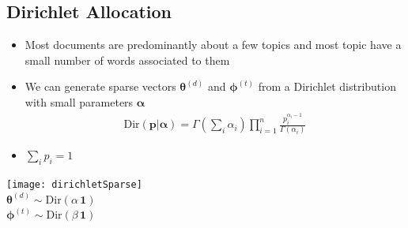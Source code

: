 \begin{slide}
\section[-2]{Dirichlet Allocation}

\begin{minipage}{0.5\linewidth}
  \begin{PauseHighLight}
  \begin{itemize}
  \item Most documents are predominantly about a few topics and most
    topic have a small number of words associated to them\pause
  \item We can generate sparse vectors $\bm{\theta}^{(d)}$ and
    $\bm{\phi}^{(t)}$ from a Dirichlet distribution with small parameters
    $\bm{\alpha}$ 
    \begin{align*}
      \mathrm{Dir}(\bm{p}|\bm{\alpha}) = \Gamma\!\left(\sum_i
      \alpha_i\right) \prod_{i=1}^n
      \frac{p_i^{\alpha_i-1}}{\Gamma(\alpha_i)}
    \end{align*}
  \item $\sum\limits_{i} p_i=1$\pause
    \end{itemize}
\end{PauseHighLight}
\end{minipage}\hfil
\begin{minipage}{0.4\linewidth}
  \begin{center}
    \texttt{[image: dirichletSparse]}\\
    $\bm{\theta}^{(d)} \sim \mathrm{Dir}(\alpha\,\bm{1})$\\
    $\bm{\phi}^{(t)}\sim \mathrm{Dir}(\beta\,\bm{1})$\pause
  \end{center}
\end{minipage}


\end{slide}


